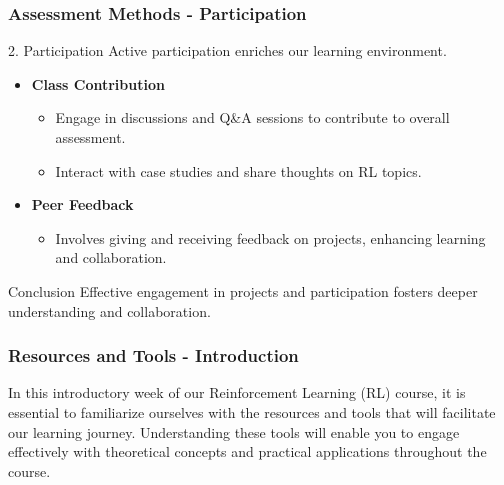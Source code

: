 \documentclass[aspectratio=169]{beamer}
\begin{document}
\begin{frame}[fragile]
    \frametitle{Assessment Methods - Participation}
    \begin{block}{2. Participation}
        Active participation enriches our learning environment.
    \end{block}
    
    \begin{itemize}
        \item \textbf{Class Contribution}
        \begin{itemize}
            \item Engage in discussions and Q\&A sessions to contribute to overall assessment.
            \item Interact with case studies and share thoughts on RL topics.
        \end{itemize}

        \item \textbf{Peer Feedback}
        \begin{itemize}
            \item Involves giving and receiving feedback on projects, enhancing learning and collaboration.
        \end{itemize}
    \end{itemize}

    \begin{block}{Conclusion}
        Effective engagement in projects and participation fosters deeper understanding and collaboration.
    \end{block}
\end{frame}

\begin{frame}[fragile]
    \frametitle{Resources and Tools - Introduction}
    In this introductory week of our Reinforcement Learning (RL) course, it is essential to familiarize ourselves with the resources and tools that will facilitate our learning journey. Understanding these tools will enable you to engage effectively with theoretical concepts and practical applications throughout the course.
\end{frame}
\end{document}
